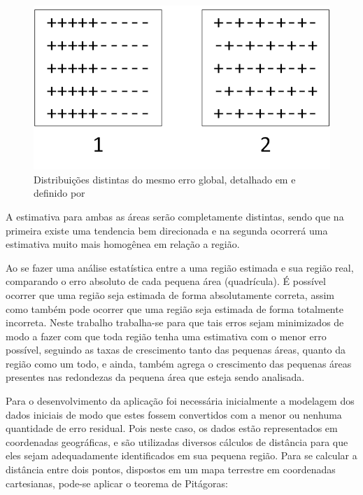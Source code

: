\begin{figure}[h]
	\centering	
	\includegraphics[scale=2]{Figuras/Ilustration-ErrorDistArango.png}
	\caption{Distribuições distintas do mesmo erro global, detalhado em \cite{arango2000thesis} e definido por \cite{willis1995spatial}}
	\label{fig:ErrorDistArango}
\end{figure}

A estimativa para ambas as áreas serão completamente distintas, sendo que na primeira existe uma tendencia bem direcionada e na segunda ocorrerá uma estimativa muito mais homogênea em relação a região. 

Ao se fazer uma análise estatística entre a uma região estimada e sua região real, comparando o erro absoluto de cada pequena área (quadrícula). É possível ocorrer que uma região seja estimada de forma absolutamente correta, assim como também pode ocorrer que uma região seja estimada de forma totalmente incorreta. Neste trabalho trabalha-se para que tais erros sejam minimizados de modo a fazer com que toda região tenha uma estimativa com o menor erro possível, seguindo as taxas de crescimento tanto das pequenas áreas, quanto da região como um todo, e ainda, também agrega o crescimento das pequenas áreas presentes nas redondezas da pequena área que esteja sendo analisada.

Para o desenvolvimento da aplicação foi necessária inicialmente a modelagem dos dados iniciais de modo que estes fossem convertidos com a menor ou nenhuma quantidade de erro residual. Pois neste caso, os dados estão representados em coordenadas geográficas, e são utilizadas diversos cálculos de distância para que eles sejam adequadamente identificados em sua pequena região. Para se calcular a distância entre dois pontos, dispostos em um mapa terrestre em coordenadas cartesianas, pode-se aplicar o teorema de Pitágoras:

